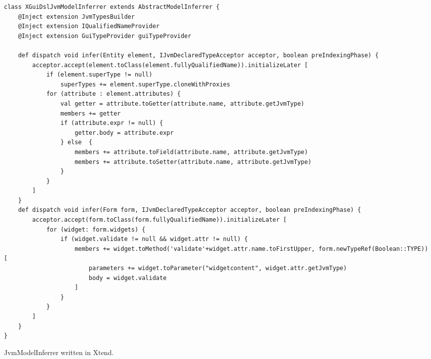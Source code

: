 
\begin{listing}[tb]
\begin{lstlisting}[language=xtend] 
class XGuiDslJvmModelInferrer extends AbstractModelInferrer {
	@Inject extension JvmTypesBuilder
	@Inject extension IQualifiedNameProvider
	@Inject extension GuiTypeProvider guiTypeProvider

	def dispatch void infer(Entity element, IJvmDeclaredTypeAcceptor acceptor, boolean preIndexingPhase) {
		acceptor.accept(element.toClass(element.fullyQualifiedName)).initializeLater [
			if (element.superType != null)
				superTypes += element.superType.cloneWithProxies
			for (attribute : element.attributes) {
				val getter = attribute.toGetter(attribute.name, attribute.getJvmType)
				members += getter
				if (attribute.expr != null) {
					getter.body = attribute.expr
				} else  {
					members += attribute.toField(attribute.name, attribute.getJvmType)
					members += attribute.toSetter(attribute.name, attribute.getJvmType)
				}
			}
		]
	}
	def dispatch void infer(Form form, IJvmDeclaredTypeAcceptor acceptor, boolean preIndexingPhase) { 
		acceptor.accept(form.toClass(form.fullyQualifiedName)).initializeLater [
			for (widget: form.widgets) {
		    	if (widget.validate != null && widget.attr != null) {
		    		members += widget.toMethod('validate'+widget.attr.name.toFirstUpper, form.newTypeRef(Boolean::TYPE)) [
		    			parameters += widget.toParameter("widgetcontent", widget.attr.getJvmType)
		    			body = widget.validate
		    		]
		    	}
		    }   		 	
   		]
   	}
}
\end{lstlisting}
\caption{JvmModelInferrer written in Xtend.}
\label{lst:xbase-jvm-inferrer}
\end{listing}

